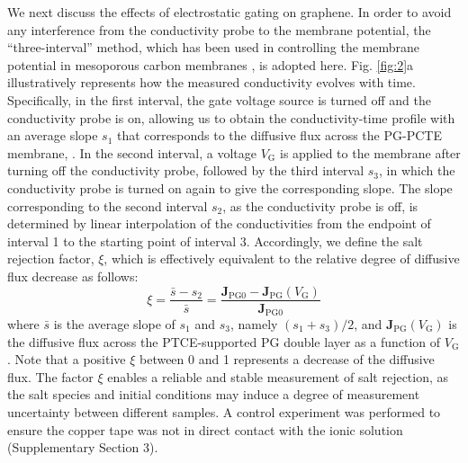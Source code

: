\documentclass[journal=langd5,email=true, hyperref=true, keywords=false]{achemso}
\newcommand{\Fig}{Fig.}
\begin{document}
We next discuss the effects of electrostatic gating on graphene. In
order to avoid any interference from the conductivity probe to the
membrane potential, the “three-interval” method, which has been used
in controlling the membrane potential in mesoporous carbon membranes
\cite{Surwade_2014}, is adopted here. \Fig{} \ref{fig:2}a
illustratively represents how the measured conductivity evolves with
time. Specifically, in the first interval, the gate voltage source is
turned off and the conductivity probe is on, allowing us to obtain the
conductivity-time profile with an average slope $s_{1}$ that
corresponds to the diffusive flux across the PG-PCTE membrane, . In
the second interval, a voltage $V_{\mathrm{G}}$ is applied to the
membrane after turning off the conductivity probe, followed by the
third interval $s_{3}$, in which the conductivity probe is turned on
again to give the corresponding slope. The slope corresponding to the
second interval $s_{2}$, as the conductivity probe is off, is
determined by linear interpolation of the conductivities from the
endpoint of interval 1 to the starting point of interval
3. Accordingly, we define the salt rejection factor, $\xi$, which is
effectively equivalent to the relative degree of diffusive flux
decrease as follows:
\begin{equation}
  \label{eq:rejection}
  \xi = \frac{\bar{s} - s_{2}}{\bar{s}} = \frac{\boldsymbol{J}_{\mathrm{PG0}}
    - \boldsymbol{J}_{\mathrm{PG}}(V_{\mathrm{G}})}{\boldsymbol{J}_{\mathrm{PG0}}}
\end{equation}
where $\bar{s}$ is the average slope of $s_{1}$ and $s_{3}$, namely
$(s_{1} + s_{3})/2$, and
$\boldsymbol{J}_{\mathrm{PG}}(V_{\mathrm{G}})$ is the diffusive flux
across the PTCE-supported PG double layer as a function of
$V_{\mathrm{G}}$. Note that a positive $\xi$ between 0 and 1
represents a decrease of the diffusive flux. The factor $\xi$ enables
a reliable and stable measurement of salt rejection, as the salt
species and initial conditions may induce a degree of measurement
uncertainty between different samples. A control experiment was
performed to ensure the copper tape was not in direct contact with the
ionic solution (Supplementary Section 3).
\end{document}
